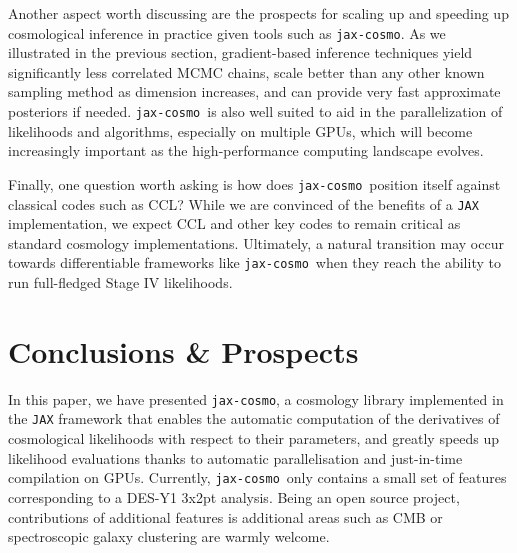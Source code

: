 \documentclass[twocolumn,twocolappendix,nofootinbib,iop]{openjournal}
\newcommand{\jaxcosmo}{\texttt{jax-cosmo}}
\begin{document}
\bigskip


Another aspect worth discussing are the prospects for scaling up and speeding up cosmological inference in practice given tools such as \jaxcosmo. As we illustrated in the previous section, gradient-based inference techniques yield significantly less correlated MCMC chains, scale better than any other known sampling method as dimension increases, and can provide very fast approximate posteriors if needed. \jaxcosmo\  is also well suited to aid in the parallelization of likelihoods and algorithms, especially on multiple GPUs, which will become increasingly important as the high-performance computing landscape evolves.



\bigskip

Finally, one question worth asking is how does \jaxcosmo\ position itself against classical codes such as CCL?  While we are convinced of the benefits of a \texttt{JAX} implementation, we expect CCL and other key codes to remain critical as standard cosmology implementations.  Ultimately, a natural transition may occur towards differentiable frameworks like \jaxcosmo\ when they reach the ability to run full-fledged Stage IV likelihoods.


\section{Conclusions \& Prospects}
\label{sec-conclusion}

In this paper, we have presented \jaxcosmo, a cosmology library implemented in the \texttt{JAX} framework that enables the automatic computation of the derivatives of cosmological likelihoods with respect to their parameters, and greatly speeds up likelihood evaluations thanks to automatic parallelisation and just-in-time compilation on GPUs. Currently, \jaxcosmo\ only contains a small set of features corresponding to a DES-Y1 3x2pt analysis. Being an open source project, contributions of additional features is additional areas such as CMB or spectroscopic galaxy clustering are warmly welcome. 
\end{document}
